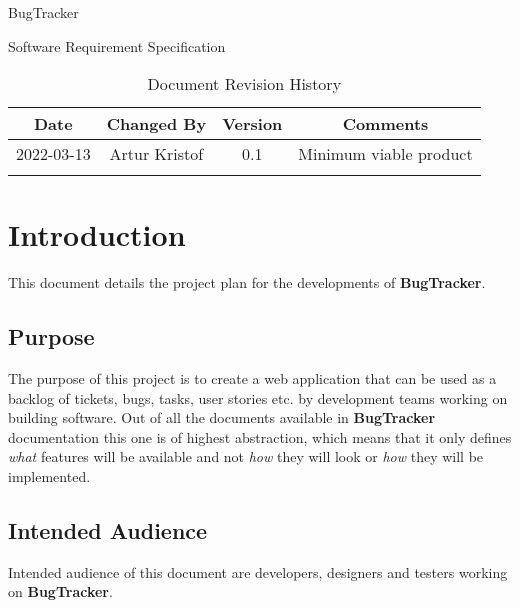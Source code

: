 \documentclass[a4paper]{article}
\newcommand{\appName}{BugTracker}
\newcommand{\appNameBold}{\textbf{BugTracker}}
\begin{document}
    \begin{titlepage}
        \vspace*{\fill}
        \begin{center}
            \huge
            \appName{}

            \vspace{0.4cm}
            \Huge
            Software Requirement Specification

            \vspace{3cm}
            \begin{table}[h]
                \centering
                \caption{Document Revision History}
                \begin{tabular}{cccc}
                    \hline
                    Date & Changed By & Version & Comments \\
                    \hline
                    2022-03-13 & Artur Kristof & 0.1 & Minimum viable product \\
                    \hfill & \hfill & \hfill & \hfill \\
                    \hline
                \end{tabular}
            \end{table}
        \end{center}
        \vspace*{\fill}
    \end{titlepage}

    \tableofcontents

    \section{Introduction}
    This document details the project plan for the developments of \appNameBold{}.

    \subsection{Purpose}
    The purpose of this project is to create a web application that can be used as a backlog of tickets, bugs, tasks, user stories etc. by development teams working on building software.
    Out of all the documents available in \appNameBold{} documentation this one is of highest abstraction, which means that it only defines \textit{what} features will be available
    and not \textit{how} they will look or \textit{how} they will be implemented.

    \subsection{Intended Audience}
    Intended audience of this document are developers, designers and testers working on \appNameBold{}.
\end{document}
